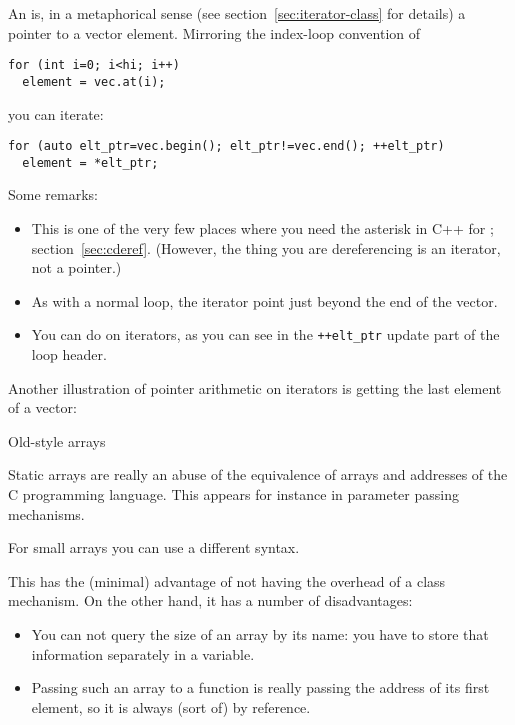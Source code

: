 An  is, in a metaphorical sense (see
section~\ref{sec:iterator-class} for details) a pointer to a vector
element. Mirroring the index-loop convention of
\begin{lstlisting}
for (int i=0; i<hi; i++)
  element = vec.at(i);
\end{lstlisting}
you can iterate:
\begin{lstlisting}
for (auto elt_ptr=vec.begin(); elt_ptr!=vec.end(); ++elt_ptr)
  element = *elt_ptr;
\end{lstlisting}
Some remarks:
\begin{itemize}
\item This is one of the very few places where you need the asterisk in C++
  for ; section~\ref{sec:cderef}. (However,
  the thing you are dereferencing is an iterator, not a pointer.)
\item As with a normal loop, the  iterator point just beyond the end
  of the vector.
\item You can do  on iterators, as
  you can see in the \verb-++elt_ptr- update part of the loop header.
\end{itemize}
Another illustration of pointer arithmetic on iterators is getting the
last element of a vector:
%

 {Old-style arrays}
\label{sec:staticarray}

Static arrays are really an abuse of the equivalence of arrays and
addresses of the C programming language. This appears for instance in
parameter passing mechanisms.

For small arrays you can use a different syntax. 


This has the
(minimal) advantage of not having the overhead of a class
mechanism. On the other hand, it has a number of disadvantages:
\begin{itemize}
\item You can not query the size of an array by its name: you have to
  store that information separately in a variable.
\item Passing such an array to a function is really passing the
  address of its first element, so it is always (sort of) by
  reference.
\end{itemize}

